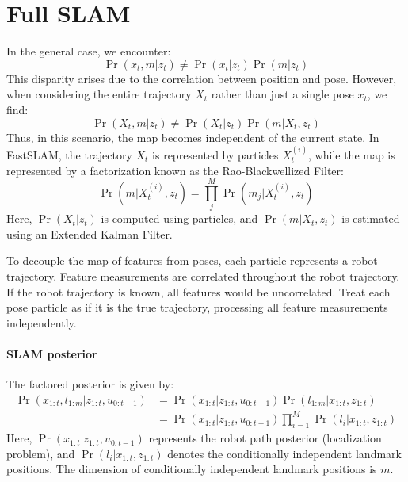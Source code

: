 \section{Full SLAM}

In the general case, we encounter:
\[\Pr(x_t,m|z_t)\neq \Pr(x_t|z_t)\Pr(m|z_t)\]
This disparity arises due to the correlation between position and pose.
However, when considering the entire trajectory $X_t$ rather than just a single pose $x_t$, we find:
\[\Pr(X_t,m|z_t)\neq \Pr(X_t|z_t)\Pr(m|X_t,z_t)\]
Thus, in this scenario, the map becomes independent of the current state.
In FastSLAM, the trajectory $X_t$ is represented by particles $X_t^{(i)}$, while the map is represented by a factorization known as the Rao-Blackwellized Filter:
\[\Pr\left(m|X_t^{(i)},z_t\right)=\prod_j^M\Pr\left(m_j|X_t^{(i)},z_t\right)\]
Here, $\Pr\left(X_t|z_t\right)$ is computed using particles, and $\Pr\left(m|X_t,z_t\right)$ is estimated using an Extended Kalman Filter.

To decouple the map of features from poses, each particle represents a robot trajectory. 
Feature measurements are correlated throughout the robot trajectory.
If the robot trajectory is known, all features would be uncorrelated. 
Treat each pose particle as if it is the true trajectory, processing all feature measurements independently.

\paragraph*{SLAM posterior}
The factored posterior is given by:
\begin{align*}
    \Pr(x_{1:t},l_{1:m}|z_{1:t},u_{0:t-1})  &=\Pr(x_{1:t}|z_{1:t},u_{0:t-1})\Pr(l_{1:m}|x_{1:t},z_{1:t}) \\
                                            &=\Pr(x_{1:t}|z_{1:t},u_{0:t-1})\prod_{i=1}^{M}\Pr(l_{i}|x_{1:t},z_{1:t})
\end{align*}
Here, $\Pr(x_{1:t}|z_{1:t},u_{0:t-1})$ represents the robot path posterior (localization problem), and $\Pr(l_{i}|x_{1:t},z_{1:t})$ denotes the conditionally independent landmark positions. 
The dimension of conditionally independent landmark positions is $m$.

